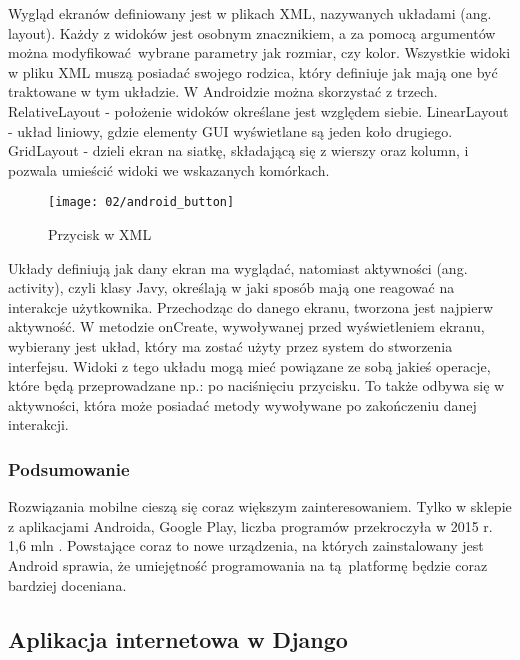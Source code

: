 Wygląd ekranów definiowany jest w plikach XML, nazywanych układami (ang. layout). Każdy z widoków jest osobnym znacznikiem, a za pomocą argumentów można modyfikować wybrane parametry jak rozmiar, czy kolor. Wszystkie widoki w pliku XML muszą posiadać swojego rodzica, który definiuje jak mają one być traktowane w tym układzie. W Androidzie można skorzystać z trzech. RelativeLayout - położenie widoków określane jest względem siebie. LinearLayout - układ liniowy, gdzie elementy GUI wyświetlane są jeden koło drugiego. GridLayout - dzieli ekran na siatkę, składającą się z wierszy oraz kolumn, i pozwala umieścić widoki we wskazanych komórkach.

\begin{wrapfigure}[5]{l}{0.25\textwidth}
	\vspace{-15pt}
	\begin{center}
		\texttt{[image: 02/android\_button]}
	\end{center}
	\vspace{-10pt}
	\caption{Przycisk w XML}
	\vspace{-10pt}
\end{wrapfigure}
Układy definiują jak dany ekran ma wyglądać, natomiast aktywności (ang. activity), czyli klasy Javy, określają w jaki sposób mają one reagować na interakcje użytkownika. Przechodząc do danego ekranu, tworzona jest najpierw aktywność. W metodzie onCreate, wywoływanej przed wyświetleniem ekranu, wybierany jest układ, który ma zostać użyty przez system do stworzenia interfejsu. Widoki z tego układu mogą mieć powiązane ze sobą jakieś operacje, które będą przeprowadzane np.: po naciśnięciu przycisku. To także odbywa się w aktywności, która może posiadać metody wywoływane po zakończeniu danej interakcji.

\subsubsection*{Podsumowanie}
Rozwiązania mobilne cieszą się coraz większym zainteresowaniem. Tylko w sklepie z aplikacjami Androida, Google Play, liczba programów przekroczyła w 2015 r. 1,6 mln \cite{biblia_ebiznesu_2}. Powstające coraz to nowe urządzenia, na których zainstalowany jest Android sprawia, że umiejętność programowania na tą platformę będzie coraz bardziej doceniana.


\subsection{Aplikacja internetowa w Django}
